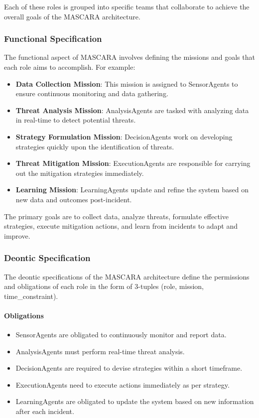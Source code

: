 \documentclass[conference]{IEEEtran}
\begin{document}
Each of these roles is grouped into specific teams that collaborate to achieve the overall goals of the MASCARA architecture.

\subsubsection*{Functional Specification}

The functional aspect of MASCARA involves defining the missions and goals that each role aims to accomplish. For example:

\begin{itemize}
    \item \textbf{Data Collection Mission}: This mission is assigned to SensorAgents to ensure continuous monitoring and data gathering.
    \item \textbf{Threat Analysis Mission}: AnalysisAgents are tasked with analyzing data in real-time to detect potential threats.
    \item \textbf{Strategy Formulation Mission}: DecisionAgents work on developing strategies quickly upon the identification of threats.
    \item \textbf{Threat Mitigation Mission}: ExecutionAgents are responsible for carrying out the mitigation strategies immediately.
    \item \textbf{Learning Mission}: LearningAgents update and refine the system based on new data and outcomes post-incident.
\end{itemize}

The primary goals are to collect data, analyze threats, formulate effective strategies, execute mitigation actions, and learn from incidents to adapt and improve.

\subsubsection*{Deontic Specification}

The deontic specifications of the MASCARA architecture define the permissions and obligations of each role in the form of 3-tuples (role, mission, time\_constraint).

\paragraph*{Obligations}

\begin{itemize}
    \item SensorAgents are obligated to continuously monitor and report data.
    \item AnalysisAgents must perform real-time threat analysis.
    \item DecisionAgents are required to devise strategies within a short timeframe.
    \item ExecutionAgents need to execute actions immediately as per strategy.
    \item LearningAgents are obligated to update the system based on new information after each incident.
\end{itemize}
\end{document}
